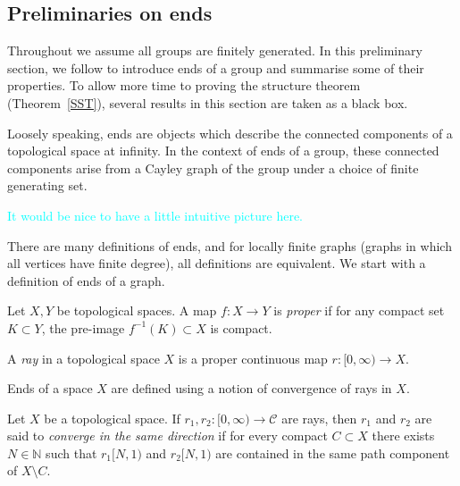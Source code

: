 \subsection{Preliminaries on ends}
Throughout we assume all groups are finitely generated. In this preliminary section, we follow \cite[p.~144--148]{bridson_haefliger_metric_1999} to introduce ends of a group and summarise some of their properties. To allow more time to proving the structure theorem (Theorem~\ref{SST}), several results in this section are taken as a black box.

Loosely speaking, ends are objects which describe the connected components of a topological space at infinity. In the context of ends of a group, these connected components arise from a Cayley graph of the group under a choice of finite generating set. 

\textcolor{cyan}{It would be nice to have a little intuitive picture here.}

There are many definitions of ends, and for locally finite graphs (graphs in which all vertices have finite degree), all definitions are equivalent. We start with a definition of ends of a graph.

\begin{definition}
    Let \(X, Y\) be topological spaces. A map \(f : X \to Y\) is \emph{proper} if for any compact set \(K \subset Y\), the pre-image \(f^{-1}(K) \subset X\) is compact.
\end{definition}

\begin{definition}[Ray]
\label{ray}
    A \emph{ray} in a topological space \(X\) is a proper continuous map \(r : [0,\infty) \to X\).
\end{definition}


Ends of a space \(X\) are defined using a notion of convergence of rays in \(X\). 

\begin{definition} 
\label{endsofgraph}
    Let \(X\) be a topological space. If \(r_1, r_2 : [0,\infty) \to \mathcal{C}\) are rays, then \(r_1\) and \(r_2\) are said to \emph{converge in the same direction} if for every compact \(C \subset X\) there exists \(N \in \mathbb{N}\) such that \(r_1[N,1)\) and \(r_2[N,1)\) are contained in the same path component of \(X \setminus C\).
\end{definition}

